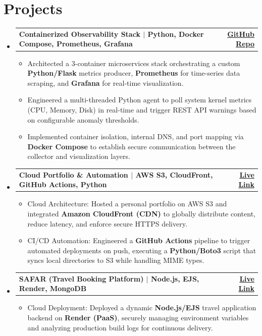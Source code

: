 \documentclass[11pt, a4paper]{article}
\makeatletter
\newcommand{\resumeItem}[1]{
  \item\small{#1}
}
\newcommand{\resumeProjectHeading}[2]{
    \vspace{-2pt}\item[]
    \begin{tabular*}{1\textwidth}{l@{\extracolsep{\fill}}r}
      \textbf{#1} & #2 \\
    \end{tabular*}\vspace{-6pt}
}
\makeatother
\begin{document}
\section{Projects}
\vspace{2pt}
\begin{itemize}[leftmargin=0in, label={}]

    \resumeProjectHeading
      {Containerized Observability Stack $|$ \small\normalfont Python, Docker Compose, Prometheus, Grafana}{\href{https://github.com/mohbha/System_Monitor/tree/master}{\textcolor{primary}{\textbf{GitHub Repo}}}}
      \begin{itemize}[leftmargin=0.15in, itemsep=1pt, parsep=0pt]
        \resumeItem{Architected a 3-container microservices stack orchestrating a custom \textbf{Python/Flask} metrics producer, \textbf{Prometheus} for time-series data scraping, and \textbf{Grafana} for real-time visualization.}
        \resumeItem{Engineered a multi-threaded Python agent to poll system kernel metrics (CPU, Memory, Disk) in real-time and trigger REST API warnings based on configurable anomaly thresholds.}
        \resumeItem{Implemented container isolation, internal DNS, and port mapping via \textbf{Docker Compose} to establish secure communication between the collector and visualization layers.}
      \end{itemize}

    \resumeProjectHeading
      {Cloud Portfolio \& Automation $|$ \small\normalfont AWS S3, CloudFront, GitHub Actions, Python}{\href{https://d84o05v9b2k31.cloudfront.net/}{\textcolor{primary}{\textbf{Live Link}}}}
      \begin{itemize}[leftmargin=0.15in, itemsep=1pt, parsep=0pt]
        \resumeItem{Cloud Architecture: Hosted a personal portfolio on AWS S3 and integrated \textbf{Amazon CloudFront (CDN)} to globally distribute content, reduce latency, and enforce secure HTTPS delivery.}
        \resumeItem{CI/CD Automation: Engineered a \textbf{GitHub Actions} pipeline to trigger automated deployments on push, executing a \textbf{Python/Boto3} script that syncs local directories to S3 while handling MIME types.}
      \end{itemize}

    \resumeProjectHeading
      {SAFAR (Travel Booking Platform) $|$ \small\normalfont Node.js, EJS, Render, MongoDB}{\href{https://safar-eyes.onrender.com/home}{\textcolor{primary}{\textbf{Live Link}}}}
      \begin{itemize}[leftmargin=0.15in, itemsep=1pt, parsep=0pt]
        \resumeItem{Cloud Deployment: Deployed a dynamic \textbf{Node.js/EJS} travel application backend on \textbf{Render (PaaS)}, securely managing environment variables and analyzing production build logs for continuous delivery.}
      \end{itemize}

\end{itemize}
\vspace{-4pt}
\end{document}
